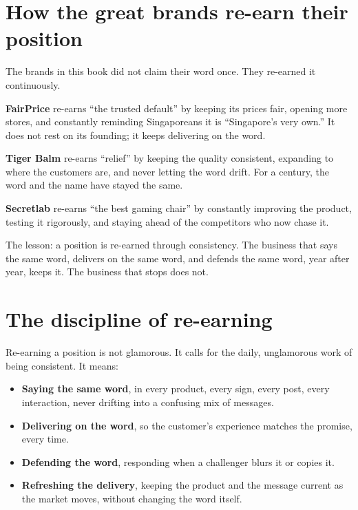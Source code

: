 \documentclass[10pt,twoside,openany]{memoir}
\newcommand{\needspacehead}{\needspace{4\baselineskip}}
\let\oldsection\section
\renewcommand{\section}{\needspacehead\oldsection}
\begin{document}
\section{How the great brands re-earn their
position}\label{how-the-great-brands-re-earn-their-position}

The brands in this book did not claim their word once. They re-earned it
continuously.

\textbf{FairPrice} re-earns ``the trusted default'' by keeping its
prices fair, opening more stores, and constantly reminding Singaporeans
it is ``Singapore's very own.'' It does not rest on its founding; it
keeps delivering on the word.

\textbf{Tiger Balm} re-earns ``relief'' by keeping the quality
consistent, expanding to where the customers are, and never letting the
word drift. For a century, the word and the name have stayed the same.

\textbf{Secretlab} re-earns ``the best gaming chair'' by constantly
improving the product, testing it rigorously, and staying ahead of the
competitors who now chase it.

The lesson: a position is re-earned through consistency. The business
that says the same word, delivers on the same word, and defends the same
word, year after year, keeps it. The business that stops does not.

\section{The discipline of
re-earning}\label{the-discipline-of-re-earning}

Re-earning a position is not glamorous. It calls for the daily,
unglamorous work of being consistent. It means:

\begin{itemize}
\tightlist
\item
  \textbf{Saying the same word}, in every product, every sign, every
  post, every interaction, never drifting into a confusing mix of
  messages.
\item
  \textbf{Delivering on the word}, so the customer's experience matches
  the promise, every time.
\item
  \textbf{Defending the word}, responding when a challenger blurs it or
  copies it.
\item
  \textbf{Refreshing the delivery}, keeping the product and the message
  current as the market moves, without changing the word itself.
\end{itemize}
\end{document}
